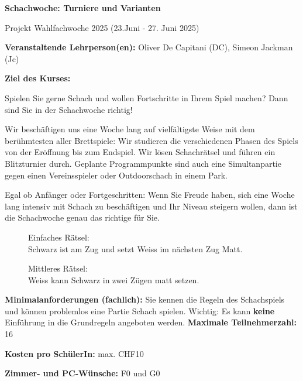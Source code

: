 \documentclass[12pt]{article}
\begin{document}


 
        \Large
        \textbf{Schachwoche: Turniere und Varianten}
 \vspace*{0.3cm}
 
         \Large
Projekt Wahlfachwoche 2025 (23.Juni - 27. Juni 2025) 
 \normalsize
 
 \vfill
 
        \textbf{Veranstaltende Lehrperson(en):} Oliver De Capitani (DC), Simeon Jackman (Jc)
 
        \vfill
        
\textbf{Ziel des Kurses:}

Spielen Sie gerne Schach und wollen Fortschritte in Ihrem Spiel machen? Dann sind Sie in der Schachwoche richtig!

Wir beschäftigen uns eine Woche lang auf vielfältigste Weise mit dem berühmtesten aller Brettspiele: Wir studieren die verschiedenen Phasen des Spiels von der Er\-öffnung bis zum Endspiel. Wir lösen Schachrätsel und führen ein Blitzturnier durch. Geplante Programmpunkte sind auch eine Simultanpartie gegen einen Vereinsspieler oder Outdoor\-schach in einem Park.	

Egal ob Anfänger oder Fortgeschritten: Wenn Sie Freude haben, sich eine Woche lang intensiv mit Schach zu beschäftigen und Ihr Niveau steigern wollen, dann ist die Schachwoche genau das richtige für Sie.

\begin{multicols}{2}
\begin{figure}[H]
\centering
\chessboard[smallboard,
setfen=4r3/2k2p1p/B6b/P6p/2bP4/8/1P4PP/R2K3R b - - 2 24,
]
\caption{Einfaches Rätsel: \\ Schwarz ist am Zug und setzt Weiss im nächsten Zug Matt.}
\end{figure}

\begin{figure}[H]
\centering
\chessboard[smallboard,
setfen=r2qk1r1/ppp1bp2/3p1p1p/3Np2Q/2B1P1b1/3P4/PPP2PPP/2KR3R w q - 6 12,
]
\caption{Mittleres Rätsel: \\ Weiss kann Schwarz in zwei Zügen matt setzen.}
\end{figure}
\end{multicols}
 
 		\vfill
 		
 		\textbf{Minimalanforderungen (fachlich):} Sie kennen die Regeln des Schachspiels und können problemlos eine Partie Schach spielen. Wichtig: Es kann {\bf keine} Einführung in die Grundregeln angeboten werden. 
\vfill
\textbf{Maximale Teilnehmerzahl:} 16

\vfill
\textbf{Kosten pro SchülerIn:}	max. CHF10


\vfill

\textbf{Zimmer- und PC-Wünsche:} F0 und G0
                 
\end{document}
